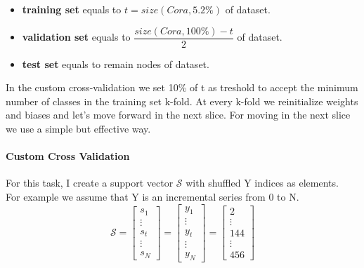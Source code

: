 \documentclass{report}
\begin{document}
\begin{itemize}

\item \textbf{training set} equals to $t=size(Cora,5.2\%)$ of dataset.
\item \textbf{validation set} equals to $\dfrac{size(Cora,100\%) - t}{2}$ of dataset.
\item \textbf{test set} equals to remain nodes of dataset.
\end{itemize}
In the custom cross-validation we set 10\% of t as treshold to accept the minimum number of classes in the training set k-fold.
At every k-fold we reinitialize weights and biases and let's move forward in the next slice. For moving in the next slice we use a simple but effective way. 

\paragraph{Custom Cross Validation} For this task, I create a support vector $\mathcal{S}$ with shuffled Y indices as elements.\\
For example we assume that Y is an incremental series from 0 to N.
\[
 \mathcal{S} =
 \begin{bmatrix}
           s_{1} \\        
           \vdots \\
           s_{t}\\
			\vdots \\
           s_{N}
         \end{bmatrix}= 
          \begin{bmatrix}
           y_{1} \\        
           \vdots \\
           y_{t}\\
			\vdots \\
           y_{N}         \end{bmatrix}=
                     \begin{bmatrix}
           2 \\        
           \vdots \\
           144\\
			\vdots \\
           456         \end{bmatrix}
\]
\end{document}
